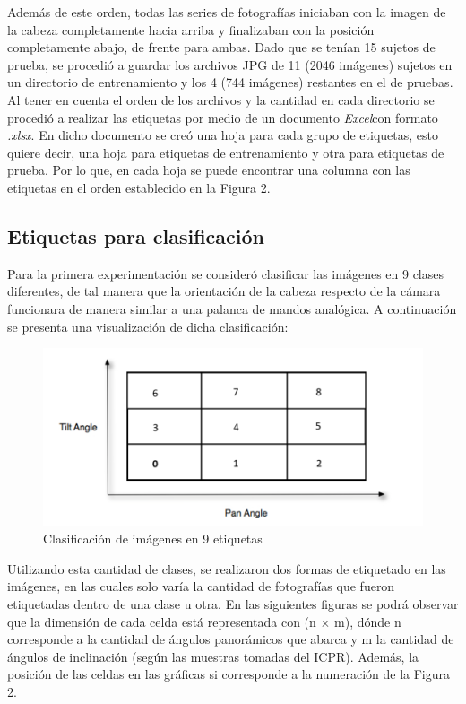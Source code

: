 Además de este orden, todas las series de fotografías iniciaban con la imagen de la cabeza completamente hacia arriba y finalizaban con la posición completamente abajo, de frente para ambas. Dado que se tenían 15 sujetos de prueba, se procedió a guardar los archivos JPG de 11 (2046 imágenes) sujetos en un directorio de entrenamiento y los 4 (744 imágenes) restantes en el de pruebas. Al tener en cuenta el orden de los archivos y la cantidad en cada directorio se procedió a realizar las etiquetas por medio de un documento \textit{Excel}con formato \textit{.xlsx}. En dicho documento se creó una hoja para cada grupo de etiquetas, esto quiere decir, una hoja para etiquetas de entrenamiento y otra para etiquetas de prueba. Por lo que, en cada hoja se puede encontrar una columna con las etiquetas en el orden establecido en la Figura 2.

\subsection{Etiquetas para clasificación}

Para la primera experimentación se consideró clasificar las imágenes en 9 clases diferentes, de tal manera que la orientación de la cabeza respecto de la cámara funcionara de manera similar a una palanca de mandos analógica. A continuación se presenta una visualización de dicha clasificación:

\begin{figure}[H]
	\centering
	\includegraphics[scale=1]{figures/clasi0.png}
	\caption{Clasificación de imágenes en 9 etiquetas}
	\label{fig:img2}
\end{figure}

Utilizando esta cantidad de clases, se realizaron dos formas de etiquetado en las imágenes, en las cuales solo varía la cantidad de fotografías que fueron etiquetadas dentro de una clase u otra. En las siguientes figuras se podrá observar que la dimensión de cada celda está representada con (n $\times$ m), dónde n corresponde a la cantidad de ángulos panorámicos que abarca y m la cantidad de ángulos de inclinación (según las muestras tomadas del ICPR). Además, la posición de las celdas en las gráficas si corresponde a la numeración de la Figura 2.


